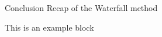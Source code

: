 \begin{frame}{Conclusion}
Recap of the Waterfall method
    \begin{exampleblock}{This is an example block}
        \lipsum[5][1-3]
    \end{exampleblock}
\end{frame}